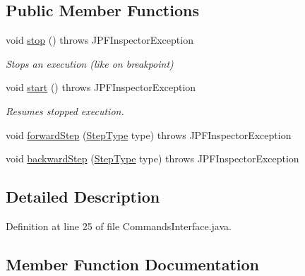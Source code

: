 \subsection*{Public Member Functions}
\begin{DoxyCompactItemize}
\item 
void \hyperlink{interfacegov_1_1nasa_1_1jpf_1_1inspector_1_1interfaces_1_1_commands_interface_a4dc6ea27e2df05a4f16dfd357dec0acf}{stop} ()  throws J\+P\+F\+Inspector\+Exception
\begin{DoxyCompactList}\small\item\em Stops an execution (like on breakpoint) \end{DoxyCompactList}\item 
void \hyperlink{interfacegov_1_1nasa_1_1jpf_1_1inspector_1_1interfaces_1_1_commands_interface_a4c7644c0aa203769bba68374c0cb07ea}{start} ()  throws J\+P\+F\+Inspector\+Exception
\begin{DoxyCompactList}\small\item\em Resumes stopped execution. \end{DoxyCompactList}\item 
void \hyperlink{interfacegov_1_1nasa_1_1jpf_1_1inspector_1_1interfaces_1_1_commands_interface_ad5c3596280086831444dcb06079c9412}{forward\+Step} (\hyperlink{enumgov_1_1nasa_1_1jpf_1_1inspector_1_1interfaces_1_1_commands_interface_1_1_step_type}{Step\+Type} type)  throws J\+P\+F\+Inspector\+Exception
\item 
void \hyperlink{interfacegov_1_1nasa_1_1jpf_1_1inspector_1_1interfaces_1_1_commands_interface_a6a6a733100d8162d5f18063519a88257}{backward\+Step} (\hyperlink{enumgov_1_1nasa_1_1jpf_1_1inspector_1_1interfaces_1_1_commands_interface_1_1_step_type}{Step\+Type} type)  throws J\+P\+F\+Inspector\+Exception
\end{DoxyCompactItemize}


\subsection{Detailed Description}


Definition at line 25 of file Commands\+Interface.\+java.



\subsection{Member Function Documentation}
